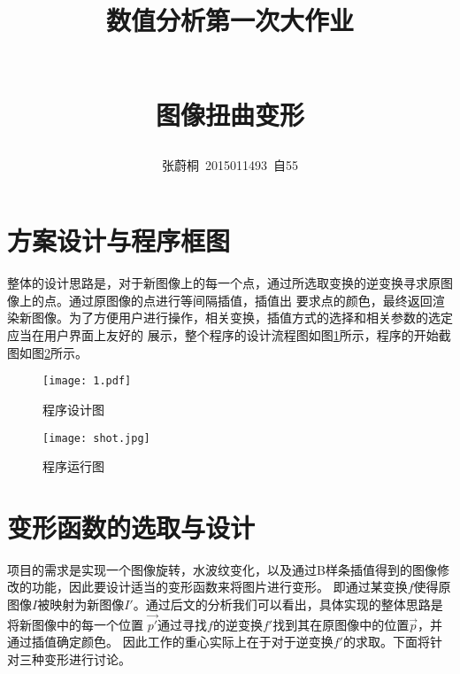 \documentclass[UTF8,a4paper]{paper}
\title{\begin{large}数值分析第一次大作业\end{large}\\ 图像扭曲变形}
\author{张蔚桐\ 2015011493\ 自55}
\begin{document}
\maketitle
\tableofcontents
\clearpage
\section{方案设计与程序框图}
整体的设计思路是，对于新图像上的每一个点，通过所选取变换的逆变换寻求原图像上的点。通过原图像的点进行等间隔插值，插值出
要求点的颜色，最终返回渲染新图像。为了方便用户进行操作，相关变换，插值方式的选择和相关参数的选定应当在用户界面上友好的
展示，整个程序的设计流程图如图\ref{fig1}所示，程序的开始截图如图\ref{fig2}所示。
\begin{figure}[h]
    \centering
    \texttt{[image: 1.pdf]}
    \caption{程序设计图}
    \label{fig1}
\end{figure}
\begin{figure}[h]
    \centering
    \texttt{[image: shot.jpg]}
    \caption{程序运行图}
    \label{fig2}
\end{figure}
\section{变形函数的选取与设计}
项目的需求是实现一个图像旋转，水波纹变化，以及通过B样条插值得到的图像修改的功能，因此要设计适当的变形函数来将图片进行变形。
即通过某变换$f$使得原图像$I$被映射为新图像$I'$。通过后文的分析我们可以看出，具体实现的整体思路是将新图像中的每一个位置
$\vec{p'}$通过寻找$f$的逆变换$f'$找到其在原图像中的位置$\vec{p}$，并通过插值确定颜色。
因此工作的重心实际上在于对于逆变换$f'$的求取。下面将针对三种变形进行讨论。
\end{document}
